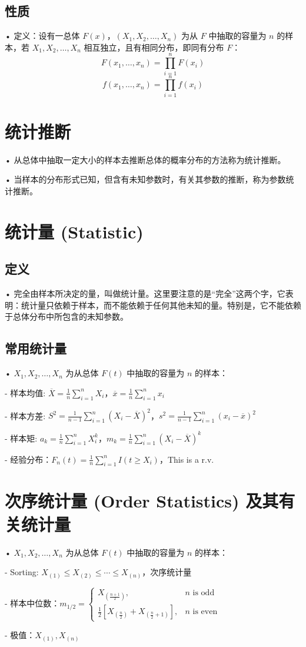 \documentclass[UTF8]{report}
\theoremstyle{MyLineTheoremStyle} %
\theoremstyle{MyBlockTheoremStyle} %
\theoremstyle{MySubsubsectionStyle} %
\begin{document}
\subsection{性质}
• 定义：设有一总体 $F(x)$，$(X_1, X_2, \ldots, X_n)$ 为从 $F$ 中抽取的容量为 $n$ 的样本，若 $X_1, X_2, \ldots, X_n$ 相互独立，且有相同分布，即同有分布 $F$：
\[
F(x_1, \ldots, x_n) = \prod_{i=1}^{n} F(x_i)
\]
\[
f(x_1, \ldots, x_n) = \prod_{i=1}^{n} f(x_i)
\]

\section{统计推断}
• 从总体中抽取一定大小的样本去推断总体的概率分布的方法称为统计推断。\par
• 当样本的分布形式已知，但含有未知参数时，有关其参数的推断，称为参数统计推断。

\section{统计量 (Statistic)}
\subsection{定义}
• 完全由样本所决定的量，叫做统计量。这里要注意的是“完全”这两个字，它表明：统计量只依赖于样本，而不能依赖于任何其他未知的量。特别是，它不能依赖于总体分布中所包含的未知参数。

\subsection{常用统计量}
• $X_1, X_2, \ldots, X_n$ 为从总体 $F(t)$ 中抽取的容量为 $n$ 的样本：\par
  - 样本均值: $\overline{X} = \frac{1}{n} \sum_{i=1}^{n} X_i$，$\overline{x} = \frac{1}{n} \sum_{i=1}^{n} x_i$\par
  - 样本方差: $S^2 = \frac{1}{n-1} \sum_{i=1}^{n} (X_i - \overline{X})^2$，$s^2 = \frac{1}{n-1} \sum_{i=1}^{n} (x_i - \overline{x})^2$\par
  - 样本矩: $a_k = \frac{1}{n} \sum_{i=1}^{n} X_i^k$，$m_k = \frac{1}{n} \sum_{i=1}^{n} (X_i - \overline{X})^k$\par
  - 经验分布：$F_n(t) = \frac{1}{n} \sum_{i=1}^{n} I(t \geq X_i)$，This is a r.v.

\section{次序统计量 (Order Statistics) 及其有关统计量}
• $X_1, X_2, \ldots, X_n$ 为从总体 $F(t)$ 中抽取的容量为 $n$ 的样本：\par
  - Sorting: $X_{(1)} \leq X_{(2)} \leq \cdots \leq X_{(n)}$，次序统计量\par
  - 样本中位数：$m_{1/2} = \begin{cases} X_{(\frac{n+1}{2})}, & n \text{ is odd} \\ \frac{1}{2} [X_{(\frac{n}{2})} + X_{(\frac{n}{2}+1)}], & n \text{ is even} \end{cases}$\par
  - 极值：$X_{(1)}, X_{(n)}$
\end{document}
